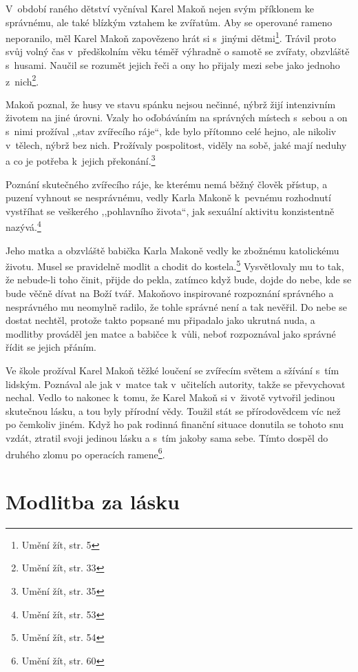 V~období raného dětství vyčníval Karel Makoň nejen svým příklonem ke správnému, ale
také blízkým vztahem ke zvířatům. Aby se operované rameno neporanilo, měl
Karel Makoň zapovězeno hrát si s~jinými dětmi\footnote{Umění žít, str. 5}. Trávil proto svůj volný čas
v~předškolním věku téměř výhradně o samotě se zvířaty, obzvláště s~husami.
Naučil se rozumět jejich řeči a ony ho přijaly mezi sebe jako jednoho z~nich\footnote{Umění žít, str. 33}.

Makoň poznal, že husy ve stavu spánku nejsou nečinné, nýbrž žijí intenzivním
životem na jiné úrovni. Vzaly ho oďobáváním na správných místech s~sebou a on
s~nimi prožíval ,,stav zvířecího ráje``, kde bylo přítomno celé hejno, ale
nikoliv v~tělech, nýbrž bez nich. Prožívaly pospolitost, viděly na sobě, jaké
mají neduhy a co je potřeba k~jejich překonání.\footnote{Umění žít, str. 35}

Poznání skutečného zvířecího ráje, ke kterému nemá běžný člověk přístup, a
puzení vyhnout se nesprávnému, vedly Karla Makoně k~pevnému rozhodnutí vystříhat
se veškerého ,,pohlavního života``, jak sexuální aktivitu konzistentně
nazývá.\footnote{Umění žít, str. 53}

Jeho matka a obzvláště babička Karla Makoně vedly ke zbožnému katolickému
životu. Musel se pravidelně modlit a chodit do kostela.\footnote{Umění žít, str.
54} Vysvětlovaly mu to tak,
že nebude-li toho činit, přijde do pekla, zatímco když bude, dojde do nebe, kde
se bude věčně dívat na Boží tvář. Makoňovo inspirované rozpoznání správného a
nesprávného mu neomylně radilo, že tohle správné není a tak nevěřil. Do nebe se
dostat nechtěl, protože takto popsané mu připadalo jako ukrutná nuda, a modlitby
prováděl jen matce a babičce k~vůli, neboť rozpoznával jako správné řídit se
jejich přáním.

Ve škole prožíval Karel Makoň těžké loučení se zvířecím světem a sžívání s~tím
lidským. Poznával ale jak v~matce tak v~učitelích autority, takže se převychovat
nechal. Vedlo to nakonec k~tomu, že Karel Makoň si v~životě vytvořil jedinou
skutečnou lásku, a tou byly přírodní vědy. Toužil stát se přírodovědcem víc než
po čemkoliv jiném. Když ho pak rodinná finanční situace donutila se tohoto snu
vzdát, ztratil svoji jedinou lásku a s~tím jakoby sama sebe.
Tímto dospěl do druhého zlomu po operacích ramene\footnote{Umění žít, str. 60}.

\section{Modlitba za lásku}

